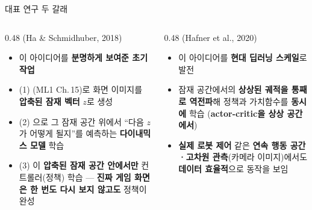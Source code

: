 \documentclass[aspectratio=169,11pt]{beamer}
\begin{document}
\begin{frame}{대표 연구 두 갈래}
  \begin{columns}[T]
    \begin{column}{0.48\textwidth}
       (Ha \& Schmidhuber, 2018)
      \begin{itemize}
        \item 이 아이디어를 \textbf{분명하게 보여준 초기
          작업}
        \item (1) (ML1 Ch.\,15)로 화면 이미지를
          \textbf{압축된 잠재 벡터} $z$로 생성
        \item (2) 으로 그 잠재 공간 위에서
          ``다음 $z$가 어떻게 될지''를 예측하는
          \textbf{다이내믹스 모델} 학습
        \item (3) 이 \textbf{압축된 잠재 공간 안에서만}
          컨트롤러(정책) 학습 --- \textbf{진짜 게임 화면은
          한 번도 다시 보지 않고도} 정책이 완성
      \end{itemize}
    \end{column}
    \begin{column}{0.48\textwidth}
       (Hafner et al., 2020)
      \begin{itemize}
        \item 이 아이디어를 \textbf{현대 딥러닝 스케일}로
          발전
        \item 잠재 공간에서의 \textbf{상상된 궤적을 통째로
          역전파}해 정책과 가치함수를 \textbf{동시에} 학습
          (\textbf{actor-critic을 상상 공간에서})
        \item \textbf{실제 로봇 제어} 같은 \textbf{연속 행동
          공간·고차원 관측}(카메라 이미지)에서도
          \textbf{데이터 효율적}으로 동작을 보임
      \end{itemize}
    \end{column}
  \end{columns}
\end{frame}

\end{document}
